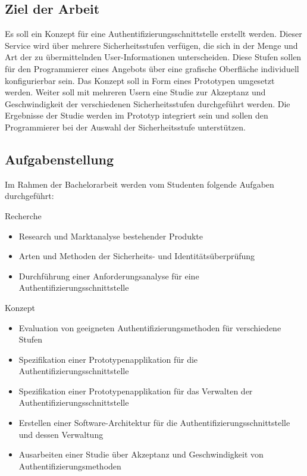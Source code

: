 \subsection{Ziel der Arbeit}\label{ziel-der-arbeit}

Es soll ein Konzept für eine Authentifizierungsschnittstelle erstellt
werden. Dieser Service wird über mehrere Sicherheitsstufen verfügen, die
sich in der Menge und Art der zu übermittelnden User-Informationen
unterscheiden. Diese Stufen sollen für den Programmierer eines Angebots
über eine grafische Oberfläche individuell konfigurierbar sein. Das
Konzept soll in Form eines Prototypen umgesetzt werden. Weiter soll mit
mehreren Usern eine Studie zur Akzeptanz und Geschwindigkeit der
verschiedenen Sicherheitsstufen durchgeführt werden. Die Ergebnisse der
Studie werden im Prototyp integriert sein und sollen den Programmierer
bei der Auswahl der Sicherheitsstufe unterstützen.

\subsection{Aufgabenstellung}\label{aufgabenstellung-1}

Im Rahmen der Bachelorarbeit werden vom Studenten folgende Aufgaben
durchgeführt:

Recherche

\begin{itemize}
\tightlist
\item
  Research und Marktanalyse bestehender Produkte
\item
  Arten und Methoden der Sicherheits- und Identitätsüberprüfung
\item
  Durchführung einer Anforderungsanalyse für eine
  Authentifizierungsschnittstelle
\end{itemize}

Konzept

\begin{itemize}
\tightlist
\item
  Evaluation von geeigneten Authentifizierungsmethoden für verschiedene
  Stufen
\item
  Spezifikation einer Prototypenapplikation für die
  Authentifizierungsschnittstelle
\item
  Spezifikation einer Prototypenapplikation für das Verwalten der
  Authentifizierungsschnittstelle
\item
  Erstellen einer Software-Architektur für die
  Authentifizierungsschnittstelle und dessen Verwaltung
\item
  Ausarbeiten einer Studie über Akzeptanz und Geschwindigkeit von
  Authentifizierungsmethoden
\end{itemize}

